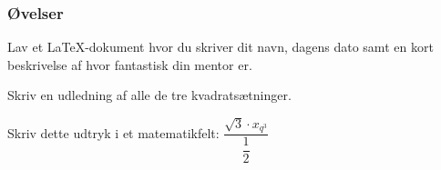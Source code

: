 \documentclass[titlepage]{article}
\begin{document}
\subsubsection{Øvelser}
\begin{opg}
Lav et \LaTeX{-dokument} hvor du skriver dit navn, dagens dato samt en kort beskrivelse af hvor fantastisk din mentor er. 
\end{opg}

\begin{opg}
Skriv en udledning af alle de tre kvadratsætninger.
\end{opg}

\begin{opg}
Skriv dette udtryk i et matematikfelt: $\dfrac{\sqrt{3} \cdot  x_{q^3}}{\dfrac{1}{2}}$
\end{opg}
\end{document}
